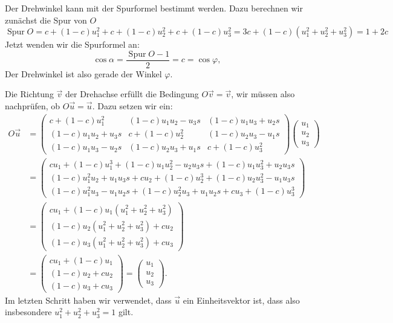 \begin{loesung}
\begin{teilaufgaben}
\item
Der Drehwinkel kann mit der Spurformel bestimmt werden. Dazu berechnen
wir zunächst die Spur von $O$
\[
\operatorname{Spur}O=
c+(1-c)u_1^2+c+(1-c)u_2^2+c+(1-c)u_3^2=3c+(1-c)(u_1^2+u_2^2+u_3^2)=1+2c
\]
Jetzt wenden wir die Spurformel an:
\[
\cos\alpha=\frac{\operatorname{Spur}O-1}2=c=\cos\varphi,
\]
Der Drehwinkel ist also gerade der Winkel $\varphi.$
\item
Die Richtung $\vec v$ der Drehachse erfüllt die Bedingung $O\vec v=\vec v$,
wir müssen also nachprüfen, ob $O\vec u=\vec u$.
Dazu setzen wir ein:
\begin{align*}
O\vec u
&=
\begin{pmatrix}
c+(1-c)u_1^2    &(1-c)u_1u_2-u_3s   &(1-c)u_1u_3+u_2s\\
(1-c)u_1u_2+u_3s&c+(1-c)u_2^2       &(1-c)u_2u_3-u_1s\\
(1-c)u_1u_3-u_2s&(1-c)u_2u_3+u_1s   &c+(1-c)u_3^2
\end{pmatrix}
\begin{pmatrix}u_1\\u_2\\u_3\end{pmatrix}
\\
&=
\begin{pmatrix}
cu_1+(1-c)u_1^3 +(1-c)u_1u_2^2-u_2u_3s+(1-c)u_1u_3^2+u_2u_3s\\
(1-c)u_1^2u_2+u_1u_3s+cu_2+(1-c)u_2^3+(1-c)u_2u_3^2-u_1u_3s\\
(1-c)u_1^2u_3-u_1u_2s+(1-c)u_2^2u_3+u_1u_2s+cu_3+(1-c)u_3^3
\end{pmatrix}
\\
&=
\begin{pmatrix}
cu_1+(1-c)u_1(u_1^2+u_2^2+u_3^2)\\
(1-c)u_2(u_1^2+u_2^2+u_3^2)+cu_2\\
(1-c)u_3(u_1^2+u_2^2+u_3^2)+cu_3
\end{pmatrix}
\\
&=
\begin{pmatrix}
cu_1+(1-c)u_1\\
(1-c)u_2+cu_2\\
(1-c)u_3+cu_3
\end{pmatrix}
=\begin{pmatrix}u_1\\u_2\\u_3\end{pmatrix}.
\end{align*}
Im letzten Schritt haben wir verwendet, dass $\vec u$ ein Einheitsvektor
ist, dass also insbesondere $u_1^2 + u_2^2 + u_3^2=1$ gilt.
\qedhere
\end{teilaufgaben}
\end{loesung}

